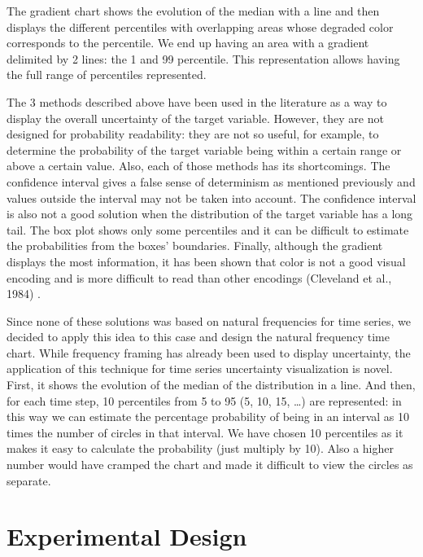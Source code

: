\documentclass[a4paper,3p,sort&compress]{elsarticle}
\begin{document}
The gradient chart shows the evolution of the median with a line and then
displays the different percentiles with overlapping areas whose degraded color
corresponds to the percentile. We end up having an area with a gradient
delimited by 2 lines: the 1 and 99 percentile. This representation
allows having the full range of percentiles represented.

The 3 methods described above have been used in the literature as a way to
display the overall uncertainty of the target variable. However, they are not
designed for probability readability: they are not so useful, for example, to
determine the probability of the target variable being within a certain range or
above a certain value. Also, each of those methods has its shortcomings. The
confidence interval gives a false sense of determinism as mentioned previously
and values outside the interval may not be taken into account. The confidence
interval is also not a good solution when the distribution of the target
variable has a long tail. The box plot shows only some percentiles and it can be
difficult to estimate the probabilities from the boxes' boundaries. Finally,
although the gradient displays the most information, it has been shown that
color is not a good visual encoding and is more difficult to read than other
encodings (Cleveland et al., 1984) \cite{cleveland_graphical_1984}.

Since none of these solutions was based on natural frequencies for time series,
we decided to apply this idea to this case and design the natural frequency time
chart. While frequency framing has already been used to display uncertainty, the
application of this technique for time series uncertainty visualization is
novel. First, it shows the evolution of the median of the distribution in a
line. And then, for each time step, 10 percentiles from 5 to 95
(5, 10, 15, \ldots) are represented: in this way we can estimate
the percentage probability of being in an interval as 10 times the number of
circles in that interval. We have chosen 10 percentiles as it makes it easy to
calculate the probability (just multiply by 10). Also a higher number would have
cramped the chart and made it difficult to view the circles as separate.

\section{Experimental Design}
\label{sec:exp_design}
\end{document}
